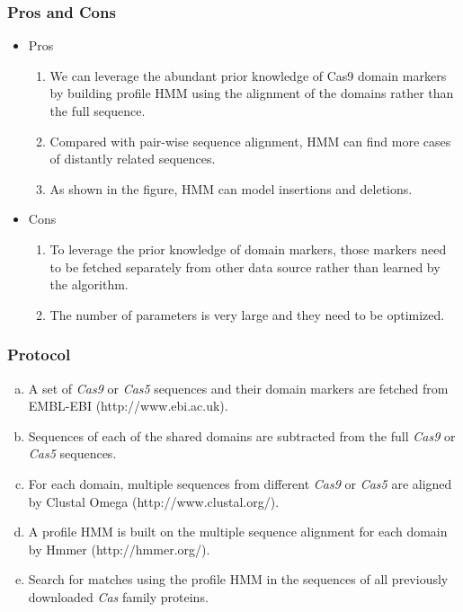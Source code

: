 \documentclass[11pt, oneside]{article}
\begin{document}
\medskip
\subsubsection{Pros and Cons}
\begin{itemize}
\item Pros
\begin{enumerate}
\item We can leverage the abundant prior knowledge of Cas9 domain markers by building profile HMM using the alignment of the domains rather than the full sequence.
\item Compared with pair-wise sequence alignment, HMM can find more cases of distantly related sequences.
\item As shown in the figure, HMM can model insertions and deletions.
\end{enumerate}
\item Cons
\begin{enumerate}
\item To leverage the prior knowledge of domain markers, those markers need to be fetched separately from other data source rather than learned by the algorithm.
\item The number of parameters is very large and they need to be optimized.
\end{enumerate}
\end{itemize}

\medskip
\subsubsection{Protocol}
\begin{enumerate}[a.]
\item A set of \textit{Cas9} or \textit{Cas5} sequences and their domain markers are fetched from EMBL-EBI (http://www.ebi.ac.uk).
\item Sequences of each of the shared domains are subtracted from the full \textit{Cas9} or \textit{Cas5} sequences.
\item For each domain, multiple sequences from different \textit{Cas9} or \textit{Cas5} are aligned by Clustal Omega (http://www.clustal.org/).
\item  A profile HMM is built on the multiple sequence alignment for each domain by Hmmer (http://hmmer.org/)\cite{hmmer}.
\item Search for matches using the profile HMM in the sequences of all previously downloaded \textit{Cas} family proteins.
\end{enumerate}
\end{document}
